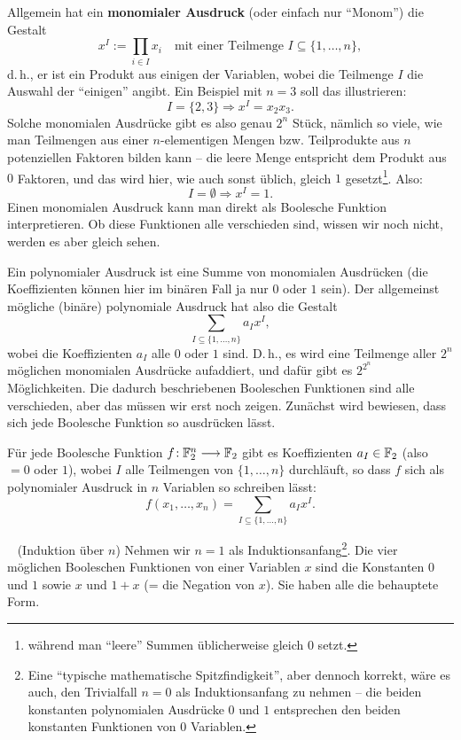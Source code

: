 \begin{refsegment}
Allgemein hat ein {\bf monomialer Ausdruck}
(oder einfach nur "`Monom"') die Gestalt
\[
    x^I := \prod_{i \in I} x_i
     \quad\text{mit einer Teilmenge } I \subseteq \{1, \ldots, n\},
\]
d.\,h., er ist ein Produkt aus einigen der Variablen, wobei die Teilmenge
$I$ die Auswahl der "`einigen"' angibt. Ein Beispiel mit $n = 3$
soll das illustrieren:
\[
      I = \{2, 3\} \Longrightarrow x^I = x_2 x_3.
\]
Solche monomialen
Ausdrücke gibt es also genau $2^n$ Stück, nämlich so viele, wie man
Teilmengen aus einer $n$-elementigen Mengen bzw.
Teilprodukte aus $n$ potenziellen Faktoren bilden kann -- die leere
Menge entspricht dem Produkt aus $0$ Faktoren, und das wird hier, wie
auch sonst üblich, gleich $1$ gesetzt\footnote{%
  während man "`leere"' Summen üblicherweise gleich $0$ setzt.
}.
Also:
\[
      I = \emptyset \Longrightarrow x^I = 1.
\]
Einen monomialen Ausdruck kann man direkt als Boolesche
Funktion
interpretieren. Ob diese Funktionen alle verschieden
sind, wissen wir noch nicht, werden es aber gleich sehen.

Ein polynomialer
Ausdruck ist eine Summe von monomialen Ausdrücken
(die Koeffizienten können hier im binären Fall ja nur $0$ oder $1$
sein). Der allgemeinst mögliche (binäre) polynomiale Ausdruck
hat also die Gestalt
\[
     \sum_{I \subseteq \{1,\ldots,n\}} a_I x^I,
\]
wobei die Koeffizienten $a_I$ alle $0$ oder $1$ sind. D.\,h., es wird
eine Teilmenge aller $2^n$ möglichen monomialen Ausdrücke aufaddiert, und
dafür gibt es $2^{2^n}$ Möglichkeiten. Die dadurch beschriebenen
Booleschen Funktionen sind alle verschieden, aber das müssen wir
erst noch zeigen. Zunächst wird bewiesen, dass sich jede Boolesche
Funktion so ausdrücken lässt.

\begin{satz}[ANF]\label{thm-bool-anf1}
  Für jede Boolesche
  Funktion $f\!: \mathbb{F}_2^n \longrightarrow \mathbb{F}_2$
  gibt es Koeffizienten $a_I \in \mathbb{F}_2$ (also $= 0$ oder $1$),
  wobei $I$ alle Teilmengen von $\{1, \ldots, n\}$ durchläuft, so dass
  $f$ sich als polynomialer
  Ausdruck in $n$ Variablen so schreiben lässt:
\begin{equation}\label{eq-bool-anf}
  f(x_1,\ldots,x_n) = \sum_{I \subseteq \{1,\ldots,n\}} a_I x^I.
\end{equation}
\end{satz}
\begin{Beweis}~
   (Induktion über $n$) Nehmen wir $n = 1$ als Induktionsanfang\footnote{%
   Eine "`typische mathematische Spitzfindigkeit"', aber dennoch korrekt,
   wäre es auch, den Trivialfall $n = 0$ als Induktionsanfang zu nehmen --
   die beiden konstanten polynomialen Ausdrücke $0$ und $1$ entsprechen
   den beiden konstanten Funktionen von $0$ Variablen.
   }.
   Die vier möglichen Booleschen Funktionen von einer Variablen $x$ sind die
   Konstanten $0$ und $1$ sowie $x$ und $1+x$ (= die Negation von $x$).
   Sie haben alle die behauptete Form.


\end{Beweis}
\end{refsegment}
